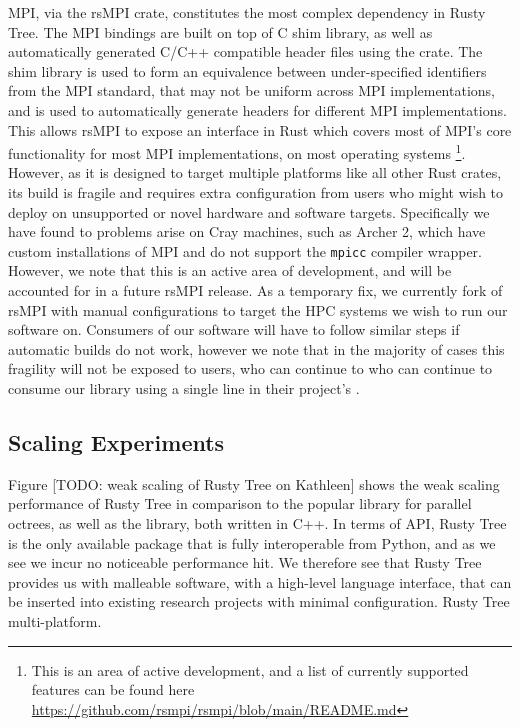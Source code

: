 MPI, via the rsMPI crate, constitutes the most complex dependency in Rusty Tree. The MPI bindings are built on top of C shim library, as well as automatically generated C/C++ compatible header files using the  crate. The shim library is used to form an equivalence between under-specified identifiers from the MPI standard, that may not be uniform across MPI implementations, and  is used to automatically generate headers for different MPI implementations. This allows rsMPI to expose an interface in Rust which covers most of MPI's core functionality for most MPI implementations, on most operating systems \footnote{This is an area of active development, and a list of currently supported features can be found here \url{https://github.com/rsmpi/rsmpi/blob/main/README.md}}. However, as it is designed to target multiple platforms like all other Rust crates, its build is fragile and requires extra configuration from users who might wish to deploy on unsupported or novel hardware and software targets. Specifically we have found to problems arise on Cray machines, such as Archer 2, which have custom installations of MPI and do not support the \texttt{mpicc} compiler wrapper. However, we note that this is an active area of development, and will be accounted for in a future rsMPI release. As a temporary fix, we currently fork of rsMPI with manual configurations to target the HPC systems we wish to run our software on. Consumers of our software will have to follow similar steps if automatic builds do not work, however we note that in the majority of cases this fragility will not be exposed to users, who can continue to who can continue to consume our library using a single line in their project's . 

\subsection*{Scaling Experiments}

Figure [TODO: weak scaling of Rusty Tree on Kathleen] shows the weak scaling performance of Rusty Tree in comparison to the popular  library for parallel octrees, as well as the  library, both written in C++. In terms of API, Rusty Tree is the only available package that is fully interoperable from Python, and as we see we incur no noticeable performance hit. We therefore see that Rusty Tree provides us with malleable software, with a high-level language interface, that can be inserted into existing research projects with minimal configuration. Rusty Tree multi-platform.

